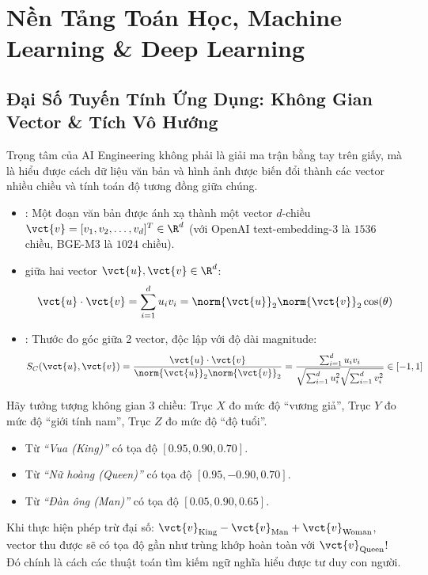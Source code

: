 
\chapter{Nền Tảng Toán Học, Machine Learning \& Deep Learning}
\label{ch:phase2-aiml}

\section{Đại Số Tuyến Tính Ứng Dụng: Không Gian Vector \& Tích Vô Hướng}
\label{sec:math-linear-algebra}

Trọng tâm của AI Engineering không phải là giải ma trận bằng tay trên giấy, mà là hiểu được cách dữ liệu văn bản và hình ảnh được biến đổi thành các vector nhiều chiều và tính toán độ tương đồng giữa chúng.

\begin{definitionbox}
\begin{itemize}
  \item {}: Một đoạn văn bản được ánh xạ thành một vector $d$-chiều $\vct{v} = [v_1, v_2, \dots, v_d]^T \in \R^d$ (với OpenAI text-embedding-3 là $1536$ chiều, BGE-M3 là $1024$ chiều).
  \item {} giữa hai vector $\vct{u}, \vct{v} \in \R^d$:
  \[
  \vct{u} \cdot \vct{v} = \sum_{i=1}^d u_i v_i = \norm{\vct{u}}_2 \norm{\vct{v}}_2 \cos(\theta)
  \]
  \item {}: Thước đo góc giữa 2 vector, độc lập với độ dài magnitude:
  \[
  S_C(\vct{u}, \vct{v}) = \frac{\vct{u} \cdot \vct{v}}{\norm{\vct{u}}_2 \norm{\vct{v}}_2} = \frac{\sum_{i=1}^d u_i v_i}{\sqrt{\sum_{i=1}^d u_i^2} \sqrt{\sum_{i=1}^d v_i^2}} \in [-1, 1]
  \]
\end{itemize}
\end{definitionbox}

\begin{intuitionbox}
Hãy tưởng tượng không gian 3 chiều: Trục $X$ đo mức độ ``vương giả'', Trục $Y$ đo mức độ ``giới tính nam'', Trục $Z$ đo mức độ ``độ tuổi''.
\begin{itemize}
  \item Từ \textit{``Vua (King)''} có tọa độ $[0.95, 0.90, 0.70]$.
  \item Từ \textit{``Nữ hoàng (Queen)''} có tọa độ $[0.95, -0.90, 0.70]$.
  \item Từ \textit{``Đàn ông (Man)''} có tọa độ $[0.05, 0.90, 0.65]$.
\end{itemize}
Khi thực hiện phép trừ đại số: $\vct{v}_{\text{King}} - \vct{v}_{\text{Man}} + \vct{v}_{\text{Woman}}$, vector thu được sẽ có tọa độ gần như trùng khớp hoàn toàn với $\vct{v}_{\text{Queen}}$! Đó chính là cách các thuật toán tìm kiếm ngữ nghĩa hiểu được tư duy con người.
\end{intuitionbox}

